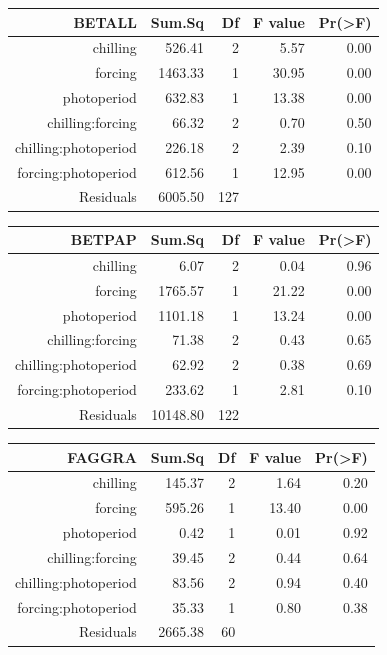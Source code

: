\documentclass{article}\usepackage[]{graphicx}\usepackage[]{color}
\begin{document}
\begin{table}[ht]
\centering
\begin{tabular}{rrrrr}
  \hline
  BETALL & Sum.Sq & Df & F value & Pr(>F) \\
 \hline
chilling & 526.41 &   2 & 5.57 & 0.00 \\ 
  forcing & 1463.33 &   1 & 30.95 & 0.00 \\ 
  photoperiod & 632.83 &   1 & 13.38 & 0.00 \\ 
  chilling:forcing & 66.32 &   2 & 0.70 & 0.50 \\ 
  chilling:photoperiod & 226.18 &   2 & 2.39 & 0.10 \\ 
  forcing:photoperiod & 612.56 &   1 & 12.95 & 0.00 \\ 
  Residuals & 6005.50 & 127 &  &  \\ 
   \hline
\end{tabular}
\end{table}
\begin{table}[ht]
\centering
\begin{tabular}{rrrrr}
  \hline
  BETPAP & Sum.Sq & Df & F value & Pr(>F) \\
 \hline
chilling & 6.07 &   2 & 0.04 & 0.96 \\ 
  forcing & 1765.57 &   1 & 21.22 & 0.00 \\ 
  photoperiod & 1101.18 &   1 & 13.24 & 0.00 \\ 
  chilling:forcing & 71.38 &   2 & 0.43 & 0.65 \\ 
  chilling:photoperiod & 62.92 &   2 & 0.38 & 0.69 \\ 
  forcing:photoperiod & 233.62 &   1 & 2.81 & 0.10 \\ 
  Residuals & 10148.80 & 122 &  &  \\ 
   \hline
\end{tabular}
\end{table}
\begin{table}[ht]
\centering
\begin{tabular}{rrrrr}
  \hline
  FAGGRA & Sum.Sq & Df & F value & Pr(>F) \\
 \hline
chilling & 145.37 &   2 & 1.64 & 0.20 \\ 
  forcing & 595.26 &   1 & 13.40 & 0.00 \\ 
  photoperiod & 0.42 &   1 & 0.01 & 0.92 \\ 
  chilling:forcing & 39.45 &   2 & 0.44 & 0.64 \\ 
  chilling:photoperiod & 83.56 &   2 & 0.94 & 0.40 \\ 
  forcing:photoperiod & 35.33 &   1 & 0.80 & 0.38 \\ 
  Residuals & 2665.38 &  60 &  &  \\ 
   \hline
\end{tabular}
\end{table}
\end{document}
